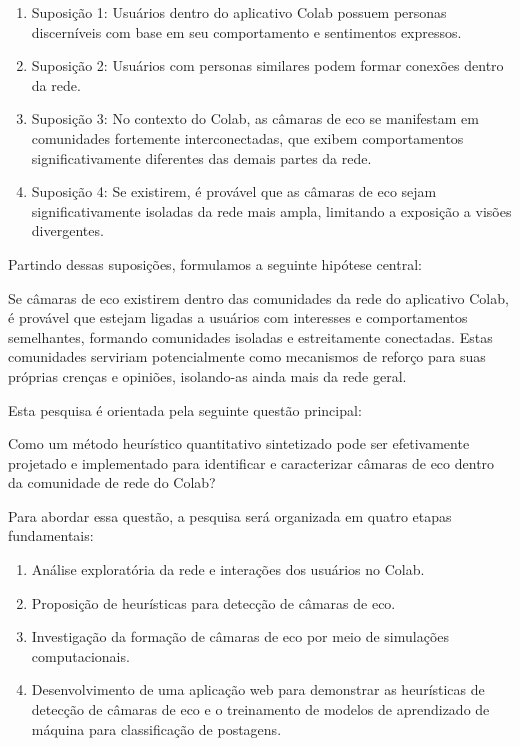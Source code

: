 \begin{enumerate}
	\item Suposição 1: Usuários dentro do aplicativo Colab possuem personas discerníveis com base em seu comportamento e sentimentos expressos.
	\item Suposição 2: Usuários com personas similares podem formar conexões dentro da rede.
	\item Suposição 3: No contexto do Colab, as câmaras de eco se manifestam em comunidades fortemente interconectadas, que exibem comportamentos significativamente diferentes das demais partes da rede.
	\item Suposição 4: Se existirem, é provável que as câmaras de eco sejam significativamente isoladas da rede mais ampla, limitando a exposição a visões divergentes.
\end{enumerate}

Partindo dessas suposições, formulamos a seguinte hipótese central:

\begin{citacao}
	Se câmaras de eco existirem dentro das comunidades da rede do aplicativo Colab, é provável que estejam ligadas a usuários com interesses e comportamentos semelhantes, formando comunidades isoladas e estreitamente conectadas. Estas comunidades serviriam potencialmente como mecanismos de reforço para suas próprias crenças e opiniões, isolando-as ainda mais da rede geral.
\end{citacao}

Esta pesquisa é orientada pela seguinte questão principal:

\begin{citacao}
	Como um método heurístico quantitativo sintetizado pode ser efetivamente projetado e implementado para identificar e caracterizar câmaras de eco dentro da comunidade de rede do Colab?
\end{citacao}

Para abordar essa questão, a pesquisa será organizada em quatro etapas fundamentais:

\begin{enumerate}
	\item Análise exploratória da rede e interações dos usuários no Colab.
	\item Proposição de heurísticas para detecção de câmaras de eco.
	\item Investigação da formação de câmaras de eco por meio de simulações computacionais.
	\item Desenvolvimento de uma aplicação web para demonstrar as heurísticas de detecção de câmaras de eco e o treinamento de modelos de aprendizado de máquina para classificação de postagens.
\end{enumerate}

